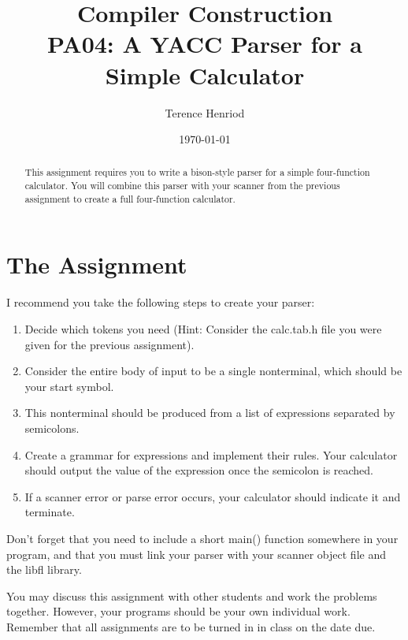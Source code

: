 \documentclass{article}
\title{Compiler Construction \\ PA04: A YACC Parser for a Simple Calculator}
\author{Terence Henriod}
\date{\today}
\begin{document}
\clearpage            %
\maketitle            %
\thispagestyle{empty} %

\begin{abstract}
\noindent This assignment requires you to write a bison-style parser for a
simple four-function calculator. You will combine this parser with your
scanner from the previous assignment to create a full four-function
calculator.
\end{abstract}

\newpage
\section{The Assignment}
I recommend you take the following steps to create your parser:

\begin{enumerate}
  \item Decide which tokens you need (Hint: Consider the calc.tab.h
  file you were given for the previous assignment).

  \item Consider the entire body of input to be a single nonterminal,
  which should be your start symbol.

  \item This nonterminal should be produced from a list of
  expressions separated by semicolons.

  \item Create a grammar for expressions and implement their rules.
  Your calculator should output the value of the expression once the
  semicolon is reached.

  \item If a scanner error or parse error occurs, your calculator
  should indicate it and terminate.
\end{enumerate}

\noindent Don't forget that you need to include a short main() function
somewhere in your program, and that you must link your parser with your
scanner object file and the libfl library.

\noindent You may discuss this assignment with other students and work the problems
together. However, your programs should be your own individual work.
Remember that all assignments are to be turned in in class on the date due.
\end{document}
